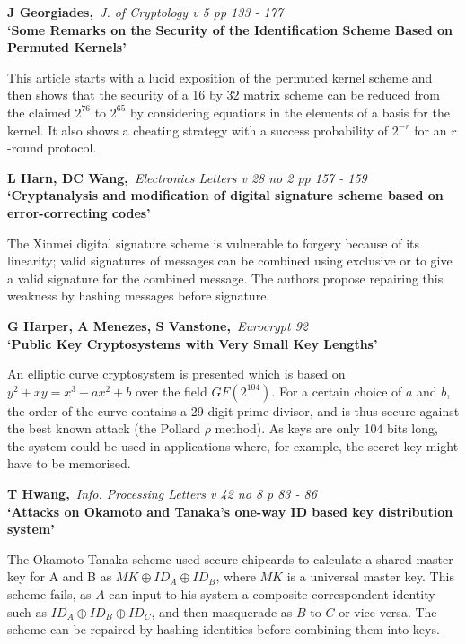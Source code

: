 {\bf \noindent J Georgiades,}{\em ~J. of Cryptology v 5 pp 133 - 177\\}
{\bf `Some Remarks on the Security of the Identification Scheme Based on
Permuted Kernels'}

This article starts with a lucid exposition of the permuted kernel scheme and
then shows that the security of a 16 by 32 matrix scheme can be reduced from 
the claimed $2^{76}$ to $2^{65}$ by considering equations in the elements of
a basis for the kernel. It also shows a cheating strategy with a success 
probability of $2^{-r}$ for an $r$-round protocol.

{\bf \noindent L Harn, DC Wang,}{\em ~Electronics Letters v 28 no 2 pp 157  - 
159\\}
{\bf `Cryptanalysis and modification of digital signature scheme based on
error-correcting codes'}

The Xinmei digital signature scheme is vulnerable to forgery because of its
linearity; valid signatures of messages can be combined using exclusive or
to give a valid signature for the combined message. The authors propose
repairing this weakness by hashing messages before signature.

{\bf \noindent G Harper, A Menezes, S Vanstone,}{\em ~Eurocrypt 92\\}
{\bf `Public Key Cryptosystems with Very Small Key Lengths'}

An elliptic curve cryptosystem is presented which is based on $y^2 + xy =
x^3 + ax^2 + b$ over the field $GF(2^{104})$. For a certain choice of $a$ 
and $b$, the order of the curve contains a 29-digit prime divisor, and is 
thus secure against the best known attack (the Pollard $\rho$ method). As
keys are only 104 bits long, the system could be used in applications where, 
for example, the secret key might have to be memorised.

{\bf \noindent T Hwang,}{\em ~Info. Processing Letters v 42 no 8 p 83 - 86\\}
{\bf `Attacks on Okamoto and Tanaka's one-way ID based key distribution
system'}

The Okamoto-Tanaka scheme used secure chipcards to calculate a shared master
key for A and B as $MK \oplus ID_A \oplus ID_B$, where $MK$ is a universal
master key. This scheme fails, as $A$ can input to his system a composite
correspondent identity such as $ID_A \oplus ID_B \oplus ID_C$, and then
masquerade as $B$ to $C$ or vice versa. The scheme can be repaired by hashing
identities before combining them into keys.


